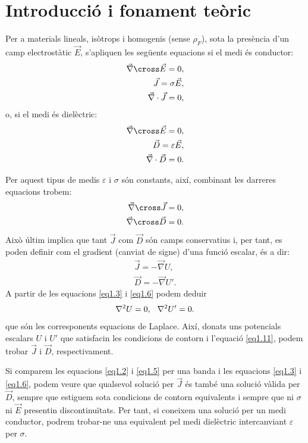 \documentclass[a4paper,10.5pt]{report}
\begin{document}
\section{Introducció i fonament teòric}
Per a materials lineals, isòtrops i homogenis (sense $\rho_F$), sota la presència d'un camp electrostàtic $\vec{E}$, s'apliquen les següents equacions si el medi és conductor:
\begin{align}
	\vec{\nabla} \cross \vec{E} = 0, \\
	\vec{J} = \sigma \vec{E} \label{eq1.2},  \\ 
	\vec{\nabla}\cdot \vec{J} = 0 \label{eq1.3},
\end{align}
o, si el medi és dielèctric:
\begin{align}
	\vec{\nabla} \cross \vec{E} = 0, \\
	\vec{D} = \varepsilon \vec{E} \label{eq1.5}, \\ 
	\vec{\nabla}\cdot \vec{D} = 0 \label{eq1.6}.
\end{align}

Per aquest tipus de medis $\varepsilon$ i $\sigma$ són constants, així, combinant les darreres equacions trobem:
\begin{align}
	\vec{\nabla} \cross \vec{J} = 0, \\
	\vec{\nabla} \cross \vec{D} = 0.
\end{align}
Això últim implica que tant $\vec{J}$ com $\vec{D}$ són camps conservatius i, per tant, es poden definir com el gradient (canviat de signe) d'una funció escalar, és a dir:
\begin{align}
	\vec{J} = -\vec{\nabla}{U}, \\
	\vec{D} = -\vec{\nabla}{U'}.
\end{align}
A partir de les equacions \eqref{eq1.3} i \eqref{eq1.6} podem deduir
\begin{equation}
	\nabla^2 U  = 0, \hspace{0.25cm} \nabla^2 U' = 0 \label{eq1.11}.
\end{equation}
que són les corresponents equacions de Laplace. Així, donats uns potencials escalars $U$ i $U'$ que satisfacin les condicions de contorn i l'equació \eqref{eq1.11}, podem trobar $\vec{J}$ i $\vec{D}$, respectivament.

Si comparem les equacions \eqref{eq1.2} i \eqref{eq1.5} per una banda i les equacions \eqref{eq1.3} i \eqref{eq1.6}, podem veure que qualsevol solució per $\vec{J}$ és també una solució vàlida per $\vec{D}$, sempre que estiguem sota condicions de contorn equivalents i sempre que ni $\sigma$ ni $\vec{E}$ presentin discontinuïtats. Per tant, si coneixem una solució per un medi conductor, podrem trobar-ne una equivalent pel medi dielèctric intercanviant $\varepsilon$ per $\sigma$.
\end{document}

